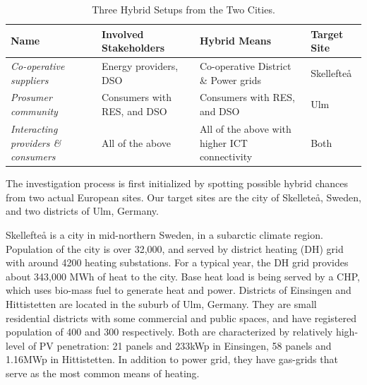 \documentclass[a4paper,twoside]{article}
\begin{document}
\begin{table}[t]
  \centering
  \caption{Three Hybrid Setups from the Two Cities.}
  \label{tab:1}
  \begin{tabular}{|p{3cm}|p{4cm}|p{4cm}|p{2cm}|}
    \hline
    Name & Involved Stakeholders & Hybrid Means & Target Site \\ \hline
    {\em Co-operative suppliers} & Energy providers, DSO & Co-operative District \& Power grids & Skellefte\aa \\ \hline 
    {\em Prosumer community} & Consumers with RES, and DSO & Consumers with RES, and DSO & Ulm \\ \hline 
    {\em Interacting providers \& consumers} & All of the above & All of the above with higher ICT connectivity & Both\\ \hline  
  \end{tabular}
\end{table}


The investigation process is first initialized by spotting possible
hybrid chances from two actual European sites. 
Our target sites are the city of Skellete\aa , Sweden, and two
districts of Ulm, Germany.  

Skellefte{\aa}  is a city in mid-northern Sweden, in a subarctic
climate region. Population of the city is over 32,000, and served by
district heating (DH) grid with around 4200 heating substations. For a 
typical year, the DH grid provides about 343,000 MWh of heat to the 
city. Base heat load is being served by a CHP, which uses bio-mass
fuel to generate heat and power. 
Districts of Einsingen and Hittistetten are located in the suburb of
Ulm, Germany. They are small residential districts with some
commercial and  public spaces, and have registered population of 400
and 300 respectively. Both are characterized by relatively high-level
of PV penetration: 21 panels and 233kWp in Einsingen, 58 panels and 
1.16MWp in Hittistetten. In addition to power grid, they have
gas-grids that serve as the most common means of heating.  
\end{document}
